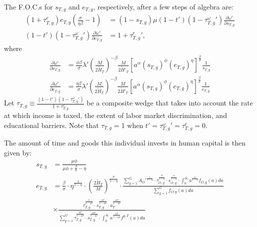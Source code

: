 \documentclass[onehalfspacing,11pt]{article}
\begin{document}
The F.O.C.s for $s_{T,g}$ and $e_{T,g}$, respectively, after a few steps of algebra are:
\begin{align}
\label{eq:foc-e}
(1+\tau^e_{T,g}) e_{T,g} \left( \frac{\sigma}{\eta\beta }-1 \right) & = \left(1-s_{T,g}\right) \mu(1-t')(1-\tau^\omega_{T,g}') \frac{\partial \omega'}{\partial s_{T,g}} \\
\label{eq:foc-s}
(1-t')(1-\tau^\omega_{T,g}') \frac{\partial \omega'}{\partial e_{T,g}} & = 1+\tau^e_{T,g}',
\end{align}
where
\begin{align}
 \frac{\partial \omega'}{\partial s_{T,g}} & =  \frac{\phi\beta }{\sigma} \lambda' \left(\frac{M}{2 \widetilde{H}_T}\right)^{-\beta} \frac{M}{2 {\widetilde{H}'_T}} \left[ a^\alpha (s_{T,g})^\phi (e_{T,g})^\eta \right]^{\frac{\beta}{\sigma}} \frac{1}{s_{T,g}} \label{eq:sT} \\
 \frac{\partial \omega'}{\partial e_{T,g}} & = \frac{\eta\beta }{\sigma} \lambda' \left(\frac{M}{2 \widetilde{H}_T}\right)^{-\beta} \frac{M}{2 {\widetilde{H}'_T}} \left[ a^\alpha (s_{T,g})^\phi (e_{T,g})^\eta \right]^{\frac{\beta}{\sigma}} \frac{1}{e_{T,g}} \label{eq:eT}
\end{align}
Let $\tau_{T,g} \equiv \frac{\left( 1-t' \right) \left( 1-\tau^\omega_{T,g}' \right)}{1+\tau^e_{T,g}}$ be a composite wedge that takes into account the rate at which income is taxed, the extent of labor market discrimination, and educational barriers. Note that $\tau_{T,g}=1$ when $t' = \tau^\omega_{T,g}' = \tau^e_{T,g} = 0$.

The amount of time and goods this individual invests in human capital is then given by:
\begin{align}
s_{T,g} & = \frac{\mu \phi}{\mu \phi+\tfrac{\beta}{\sigma}-\eta} \\
e_{T,g} & = \tfrac{\beta}{\sigma}\cdot\eta^{\frac{1}{1-\eta}}\cdot \left(\tfrac{2\widetilde{H}_T}{M}\right)^{\frac{\sigma}{1-\eta}} \cdot \frac{\sum_{g=1}^G {A_O'}^\frac{1}{1-\eta}\cdot\tau_{O,g}^\frac{\eta}{1-\eta} \cdot s_{O,g}^\frac{\phi}{1-\eta}\cdot \int_0^\infty a^{\frac{\alpha}{1-\eta}} f_{O,g}(a)da}{\sum_{g=1}^G f_{O,g}(a)da} \nonumber\\
& \times \frac{\tau_{T,g}^\frac{\sigma}{\sigma-\eta\beta } \cdot s_{T,g}^\frac{\phi\beta }{\sigma-\eta\beta } \cdot a_T^\frac{\alpha\beta }{\sigma-\eta\beta}}{\sum_{g=1}^G \tau_{T,g}^\frac{\eta\beta }{\sigma-\eta\beta } \cdot s_{T,g}^\frac{\phi\beta }{\sigma-\eta\beta } \cdot \int_0^\infty a^\frac{\alpha\beta}{\sigma-\eta\beta } f^{g,T}(a)da}
\end{align}
\end{document}
